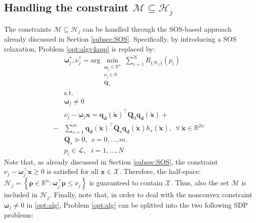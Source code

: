 \documentclass[twocolumn]{autart}
\newcommand{\tr}{\mbox{\tiny T}} %
\newcommand{\DP}[1]{{#1}}
\newcommand{\xhyp}{\mathbf{\rho}}
\newcommand{\xaug}{\tilde{\mathbf{x}}}
\newcommand{\relorder}{\DP{\mathbf{d}}}
\begin{document}
\subsection{Handling the constraint $\mathcal{M} \subseteq \mathcal{H}_j$} \label{Sec:HandConst}
The constraints $\mathcal{M} \subseteq \mathcal{H}_j$ can be handled through the SOS-based approach already discussed in Section \ref{subsec:SOS}. Specifically, by introducing a SOS relaxation, Problem  \eqref{opt:algv4app} is replaced by:
  \begin{equation} \label{opt:alg}
  \begin{split}
&\boldsymbol{\omega}^*_j,\nu^*_j=  \mbox{arg}\min_{\substack{     \boldsymbol{\omega}_j \in \mathbb{R}^n \\
                                            \nu_j \in \mathbb{R} \\
                                            \mathbf{Q}_s }} \sum_{i=1}^N R_{\{\mathcal{H}_j\}}(p_i) \\
   & \mbox{s.t. } \\
   &  \boldsymbol{\omega}_j \neq 0 \\
    & \nu_j - \boldsymbol{\omega}_j \mathbf{x}=    \mathbf{q}_\relorder(\xaug)^\top \mathbf{Q}_0 \mathbf{q}_\relorder(\xaug)+\\
   -& \sum_{s=1}^m \mathbf{q}_\relorder(\xaug)^\top \mathbf{Q}_s \mathbf{q}_\relorder(\xaug) h_s(\xaug), ~~\forall~\xaug \in \mathbb{R}^{2n}\\
  & \mathbf{Q}_s \succeq 0, \ \ s=0,\ldots,m. \\
   & p_i \in \mathcal{L}, \ \ \ i=1,\ldots,N
  \end{split}
  \end{equation}
Note that, as already discussed in Section \ref{subsec:SOS}, the constraint $\nu_j - \boldsymbol{\omega}_j^\top \mathbf{x} \geq 0$ is satisfied for all $\mathbf{x} \in \mathcal{X}$. Therefore, the half-space: $\mathcal{H}_j=\left\{ \xhyp \in \mathbb{R}^n:   \boldsymbol{\omega}_j^\top \xhyp  \leq \nu_j \right\}$ is guaranteed to contain $\mathcal{X}$. Thus, also the set $\mathcal{M}$ is included in $\mathcal{H}_j$.
Finally, note that, in order to deal with the nonconvex constraint $\boldsymbol{\omega}_j \neq 0$ in \eqref{opt:alg}, 
Problem \eqref{opt:alg} can be splitted into the two following SDP problems:
\end{document}
